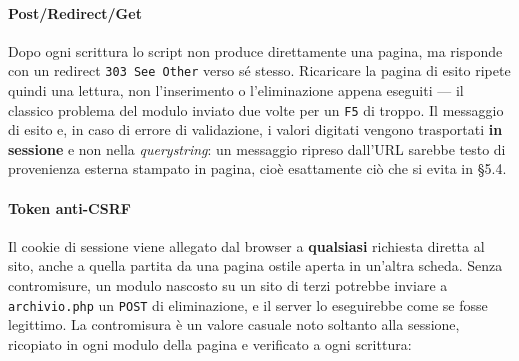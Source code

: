 \documentclass[
  11pt,
]{article}
\newenvironment{Shaded}{\begin{snugshade}}{\end{snugshade}}
\newcommand{\CommentTok}[1]{\textcolor[rgb]{0.56,0.35,0.01}{\textit{#1}}}
\newcommand{\ControlFlowTok}[1]{\textcolor[rgb]{0.13,0.29,0.53}{\textbf{#1}}}
\newcommand{\DecValTok}[1]{\textcolor[rgb]{0.00,0.00,0.81}{#1}}
\newcommand{\FunctionTok}[1]{\textcolor[rgb]{0.13,0.29,0.53}{\textbf{#1}}}
\newcommand{\KeywordTok}[1]{\textcolor[rgb]{0.13,0.29,0.53}{\textbf{#1}}}
\newcommand{\NormalTok}[1]{#1}
\newcommand{\OperatorTok}[1]{\textcolor[rgb]{0.81,0.36,0.00}{\textbf{#1}}}
\newcommand{\OtherTok}[1]{\textcolor[rgb]{0.56,0.35,0.01}{#1}}
\newcommand{\StringTok}[1]{\textcolor[rgb]{0.31,0.60,0.02}{#1}}
\newcommand{\VariableTok}[1]{\textcolor[rgb]{0.00,0.00,0.00}{#1}}
\begin{document}
\hypertarget{postredirectget}{%
\paragraph{Post/Redirect/Get}\label{postredirectget}}

Dopo ogni scrittura lo script non produce direttamente una pagina, ma
risponde con un redirect \texttt{303\ See\ Other} verso sé stesso.
Ricaricare la pagina di esito ripete quindi una lettura, non
l'inserimento o l'eliminazione appena eseguiti --- il classico problema
del modulo inviato due volte per un \texttt{F5} di troppo. Il messaggio
di esito e, in caso di errore di validazione, i valori digitati vengono
trasportati \textbf{in sessione} e non nella \emph{querystring}: un
messaggio ripreso dall'URL sarebbe testo di provenienza esterna stampato
in pagina, cioè esattamente ciò che si evita in §5.4.

\hypertarget{token-anti-csrf}{%
\paragraph{Token anti-CSRF}\label{token-anti-csrf}}

Il cookie di sessione viene allegato dal browser a \textbf{qualsiasi}
richiesta diretta al sito, anche a quella partita da una pagina ostile
aperta in un'altra scheda. Senza contromisure, un modulo nascosto su un
sito di terzi potrebbe inviare a \texttt{archivio.php} un \texttt{POST}
di eliminazione, e il server lo eseguirebbe come se fosse legittimo. La
contromisura è un valore casuale noto soltanto alla sessione, ricopiato
in ogni modulo della pagina e verificato a ogni scrittura:

\begin{Shaded}
\end{Shaded}
\end{document}
